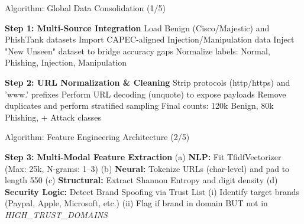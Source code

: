 \documentclass[aspectratio=169,xcolor=dvipsnames]{beamer}
\begin{document}
\begin{frame}{Algorithm: Global Data Consolidation (1/5)}
\begin{algorithm}[H]
\small
\begin{algorithmic}[1]

    \State \textbf{Step 1: Multi-Source Integration}
    \State \quad Load Benign (Cisco/Majestic) and PhishTank datasets
    \State \quad Import CAPEC-aligned Injection/Manipulation data
    \State \quad Inject "New Unseen" dataset to bridge accuracy gaps
    \State \quad Normalize labels: Normal, Phishing, Injection, Manipulation
    
    \State \textbf{Step 2: URL Normalization \& Cleaning}
    \State \quad Strip protocols (http/https) and 'www.' prefixes
    \State \quad Perform URL decoding (unquote) to expose payloads
    \State \quad Remove duplicates and perform stratified sampling
    \State \quad Final counts: 120k Benign, 80k Phishing, + Attack classes

\end{algorithmic}
\end{algorithm}
\end{frame}

\begin{frame}{Algorithm: Feature Engineering Architecture (2/5)}
\begin{algorithm}[H]
\small
\begin{algorithmic}

  \State \textbf{Step 3: Multi-Modal Feature Extraction}
  \State \hspace{1.2em}(a) \textbf{NLP:} Fit TfidfVectorizer (Max: 25k, N-grams: 1--3)
  \State \hspace{1.2em}(b) \textbf{Neural:} Tokenize URLs (char-level) and pad to length 550
  \State \hspace{1.2em}(c) \textbf{Structural:} Extract Shannon Entropy and digit density
  \State \hspace{1.2em}(d) \textbf{Security Logic:} Detect Brand Spoofing via Trust List
  \State \hspace{1.2em}\quad (i) Identify target brands (Paypal, Apple, Microsoft, etc.)
  \State \hspace{1.2em}\quad (ii) Flag if brand in domain BUT not in \textit{HIGH\_TRUST\_DOMAINS}

\end{algorithmic}
\end{algorithm}
\end{frame}
\end{document}
